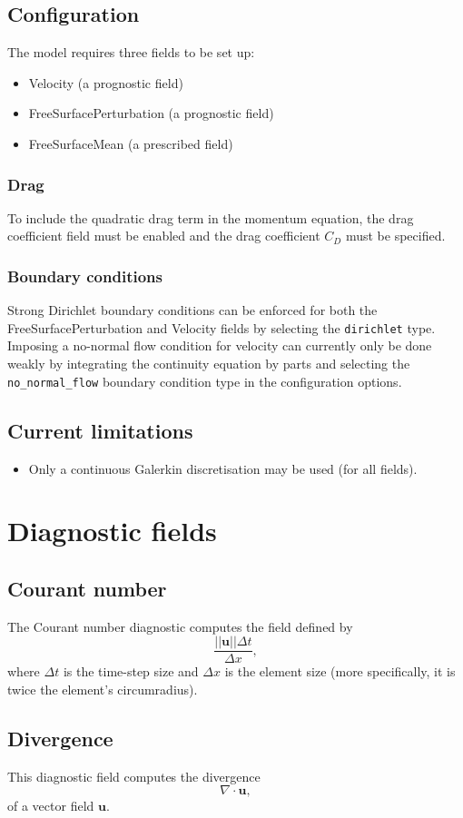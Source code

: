 \documentclass[a4paper,11pt]{report}
\begin{document}
\section{Configuration}
The model requires three fields to be set up:
\begin{itemize}
   \item Velocity (a prognostic field)
   \item FreeSurfacePerturbation (a prognostic field)
   \item FreeSurfaceMean (a prescribed field)
\end{itemize}

\subsection{Drag}
To include the quadratic drag term in the momentum equation, the drag coefficient field must be enabled and the drag coefficient $C_D$ must be specified.

\subsection{Boundary conditions}
Strong Dirichlet boundary conditions can be enforced for both the FreeSurfacePerturbation and Velocity fields by selecting the \texttt{dirichlet} type. Imposing a no-normal flow condition for velocity can currently only be done weakly by integrating the continuity equation by parts and selecting the \texttt{no\_normal\_flow} boundary condition type in the configuration options.

\section{Current limitations}
\begin{itemize}
   \item Only a continuous Galerkin discretisation may be used (for all fields).
\end{itemize}

\chapter{Diagnostic fields}

\section{Courant number}
The Courant number diagnostic computes the field defined by
\begin{equation}
   \frac{||\mathbf{u}||\Delta t}{\Delta x},
\end{equation}
where $\Delta t$ is the time-step size and $\Delta x$ is the element size (more specifically, it is twice the element's circumradius).

\section{Divergence}
This diagnostic field computes the divergence
\begin{equation}
   \nabla\cdot\mathbf{u},
\end{equation}
of a vector field $\mathbf{u}$.
\end{document}
